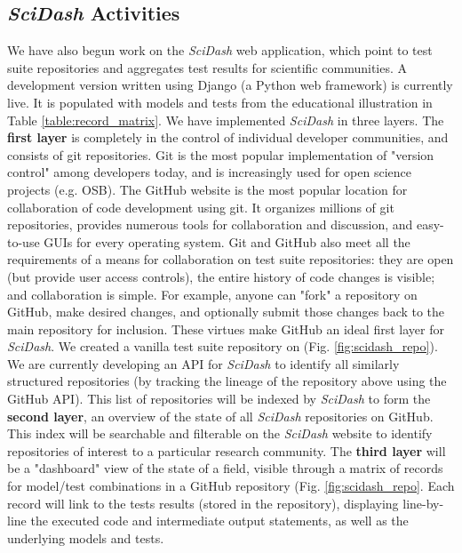 \documentclass[11pt,letterpaper]{article}
\begin{document}
\subsection{\textit{SciDash} Activities}\label{sec:scidash_activities}
We have also begun work on the \textit{SciDash} web application, which point to test suite repositories and aggregates test results for scientific communities. A development version written using Django (a Python web framework) is currently live\cite{scidash_url}.  It is populated with models and tests from the educational illustration in Table \ref{table:record_matrix}.  We have implemented \textit{SciDash} in three layers.  The \textbf{first layer} is completely in the control of individual developer communities, and consists of git repositories.  Git is the most popular implementation of "version control" among developers today\cite{git_paper}, and is increasingly used for open science projects (e.g. OSB\cite{osb_url}).  The GitHub website\cite{github_url} is the most popular location for collaboration of code development using git.  It organizes millions of git repositories, provides numerous tools for collaboration and discussion, and easy-to-use GUIs for every operating system.  Git and GitHub also meet all the requirements of a means for collaboration on test suite repositories: they are open (but provide user access controls), the entire history of code changes is visible; and collaboration is simple.  For example, anyone can "fork" a repository on GitHub, make desired changes, and optionally submit those changes back to the main repository for inclusion.  These virtues make GitHub an ideal first layer for \textit{SciDash}.  We created a vanilla test suite repository\cite{scidash_repo_url} on  (Fig. \ref{fig:scidash_repo}).  We are currently developing an API for \textit{SciDash} to identify all similarly structured repositories (by tracking the lineage of the repository above using the GitHub API).  This list of repositories will be indexed by \textit{SciDash} to form the \textbf{second layer}, an overview of the state of all \textit{SciDash} repositories on GitHub.  This index will be searchable and filterable on the \textit{SciDash} website to identify repositories of interest to a particular research community.  The \textbf{third layer} will be a "dashboard" view of the state of a field, visible through a matrix of records for model/test combinations in a GitHub repository (Fig. \ref{fig:scidash_repo}.  Each record will link to the tests results (stored in the repository), displaying line-by-line the executed code and intermediate output statements, as well as the underlying models and tests.  
\end{document}
